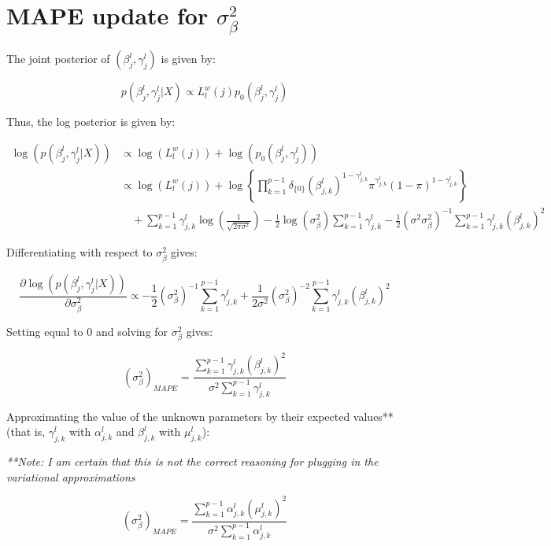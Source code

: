 \documentclass[twoside]{article}
\newcommand{\1}{\\[1ex]}
\newcommand{\2}{\\[2ex]}
\newcommand{\3}{\\[3ex]}
\newcommand{\4}{\\[4ex]}
\begin{document}
\section{MAPE update for $\sigma^2_\beta$}

The joint posterior of $(\beta_j^l,\gamma_j^l)$ is given by:

\begin{equation}
p(\beta_j^l,\gamma_j^l|X)\propto L_l^w(j)p_0(\beta_j^l, \gamma_j^l)
\end{equation}

Thus, the log posterior is given by:

\begin{align}
\log(p(\beta_j^l,\gamma_j^l|X)) & \propto \log(L_l^w(j)) + \log(p_0(\beta_j^l, \gamma_j^l))  \\
& \propto \log(L_l^w(j)) + \log\left\{\prod_{k = 1}^{p - 1}\delta_{\{0\}}\left(\beta_{j,k}^l\right)^{1- \gamma_{j,k}^l}\pi^{\gamma_{j,k}^l}(1-\pi)^{1-\gamma_{j,k}^l}\right\}\\
& \quad + \sum_{k = 1}^{p-1}\gamma_{j,k}^l\log(\frac1{\sqrt{2\pi\sigma^2}}) -\frac12\log(\sigma^2_\beta) \sum_{k = 1}^{p-1}\gamma_{j,k}^l - \frac12(\sigma^2\sigma^2_\beta)^{-1}\sum_{k=1}^{p-1}\gamma_{j,k}^l(\beta_{j,k}^l)^2
\end{align}

Differentiating with respect to $\sigma^2_\beta$ gives:

\begin{equation}
\frac{\partial\log(p(\beta_j^l,\gamma_j^l|X))}{\partial\sigma^2_\beta}\propto -\frac12(\sigma^2_\beta)^{-1} \sum_{k = 1}^{p-1}\gamma_{j,k}^l + \frac1{2\sigma^2}(\sigma^2_\beta)^{-2}\sum_{k=1}^{p-1}\gamma_{j,k}^l(\beta_{j,k}^l)^2
\end{equation}

Setting equal to 0 and solving for $\sigma^2_\beta$ gives:

\begin{equation}
(\sigma^2_\beta)_{\textit{MAPE}} = \frac{\sum_{k=1}^{p-1}\gamma_{j,k}^l(\beta_{j,k}^l)^2}{\sigma^2\sum_{k=1}^{p-1}\gamma_{j,k}^l}
\end{equation}

Approximating the value of the unknown parameters by their expected values** (that is, $\gamma_{j,k}^l$ with $\alpha_{j,k}^l$ and $\beta_{j,k}^l$ with $\mu_{j,k}^l$): 

\textit{**Note: I am certain that this is not the correct reasoning for plugging in the variational approximations}

\begin{equation}
(\sigma^2_\beta)_{\textit{MAPE}} = \frac{\sum_{k=1}^{p-1}\alpha_{j,k}^l(\mu_{j,k}^l)^2}{\sigma^2\sum_{k=1}^{p-1}\alpha_{j,k}^l}
\end{equation}
\end{document}
